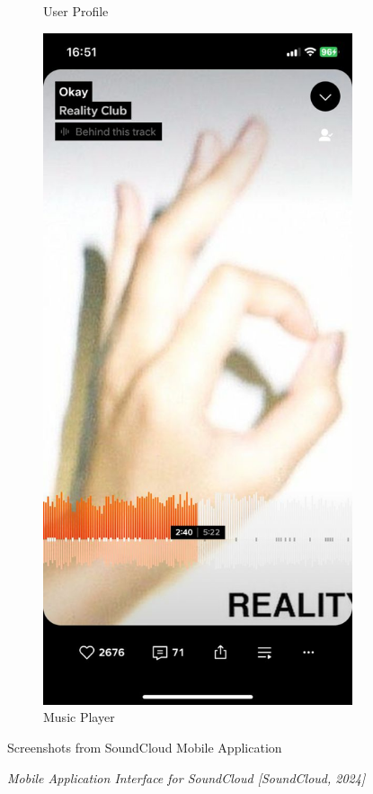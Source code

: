 \begin{figure} [h]
\begin{subfigure}{.3\linewidth}
      \caption{User Profile}
      \label{fig:myfig27}
    \end{subfigure}%
    \hspace{1em}%
    \begin{subfigure}{.3\linewidth}
      \centering
      \includegraphics[width = \linewidth]{mainmatter/images/soundcloud3.jpg}
      \caption{Music Player}
      \label{fig:myfig28}
    \end{subfigure}
    \caption{Screenshots from SoundCloud Mobile Application}
    \caption*{\textit{Mobile Application Interface for SoundCloud [SoundCloud, 2024]}}
\end{figure}
